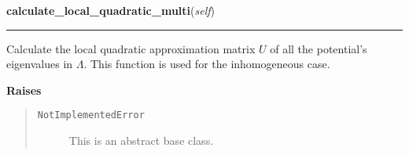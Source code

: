     \label{MatrixPotential:MatrixPotential:calculate_local_quadratic_multi}

    \vspace{0.5ex}

\hspace{.8\funcindent}\begin{boxedminipage}{\funcwidth}

    \raggedright \textbf{calculate\_local\_quadratic\_multi}(\textit{self})

    \vspace{-1.5ex}

    \rule{\textwidth}{0.5\fboxrule}
\setlength{\parskip}{2ex}
    Calculate the local quadratic approximation matrix $U$ of all the
    potential's eigenvalues in $\Lambda$. This function is
    used for the inhomogeneous case.

\setlength{\parskip}{1ex}
      \textbf{Raises}
    \vspace{-1ex}

      \begin{quote}
        \begin{description}

          \item[\texttt{NotImplementedError}]

          This is an abstract base class.

        \end{description}

      \end{quote}

    \end{boxedminipage}

    \label{MatrixPotential:MatrixPotential:evaluate_local_quadratic_multi_at}

    \vspace{0.5ex}

